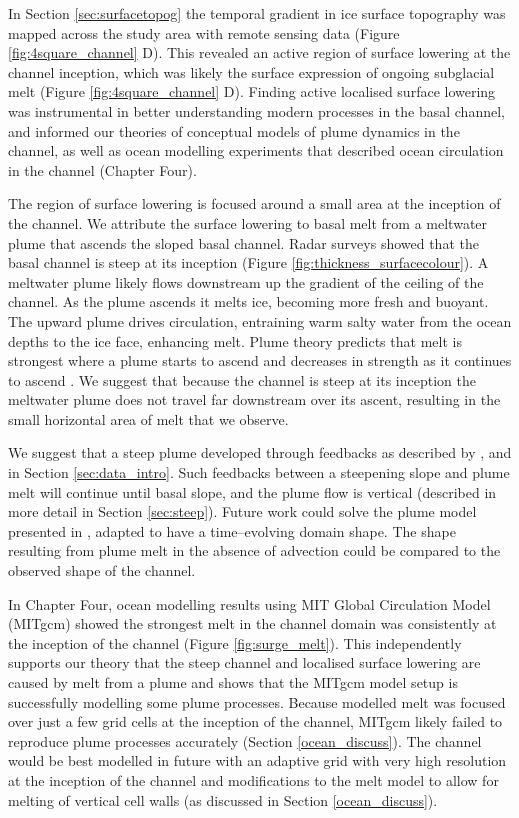 In Section \ref{sec:surfacetopog} the temporal gradient in ice surface topography was mapped across the study area with remote sensing data (Figure \ref{fig:4square_channel} D). This revealed an active region of surface lowering at the channel inception, which was likely the surface expression of ongoing subglacial melt (Figure \ref{fig:4square_channel} D).  
Finding active localised surface lowering was instrumental in better understanding modern processes in the basal channel, and informed our theories of conceptual models of plume dynamics in the channel, as well as ocean modelling experiments that described ocean circulation in the channel (Chapter Four). 

The region of surface lowering is focused around a small area at the inception of the channel. We attribute the surface lowering to basal melt from a meltwater plume that ascends the sloped basal channel. Radar surveys showed that the basal channel is steep at its inception (Figure \ref{fig:thickness_surfacecolour}). A meltwater plume likely flows downstream up the gradient of the ceiling of the channel. As the plume ascends it melts ice, becoming more fresh and buoyant. The upward plume drives circulation, entraining warm salty water from the ocean depths to the ice face, enhancing melt.  Plume theory predicts that melt is strongest where a plume starts to ascend and decreases in strength as it continues to ascend \citep{jenkins1991one}. We suggest that because the channel is steep at its inception the meltwater plume does not travel far downstream over its ascent, resulting in the small horizontal area of melt that we observe. 

We suggest that a steep plume developed through feedbacks as described by \cite{sergienko2013basal}, and in Section \ref{sec:data_intro}. Such feedbacks between a steepening slope and plume melt will continue until basal slope, and the plume flow is vertical (described in more detail in Section \ref{sec:steep}).    
Future work could solve the plume model presented in \cite{jenkins2011convection}, adapted to have a time--evolving domain shape. The shape resulting from plume melt in the absence of advection could be compared to the observed shape of the channel. 

In Chapter Four, ocean modelling results using MIT Global Circulation Model (MITgcm) showed the strongest melt in the channel domain was consistently at the inception of the channel (Figure \ref{fig:surge_melt}). This independently supports our theory that the steep channel and localised surface lowering are caused by melt from a plume and shows that the MITgcm model setup is successfully modelling some plume processes.
Because modelled melt was focused over just a few grid cells at the inception of the channel,  MITgcm likely failed to reproduce plume processes accurately (Section \ref{ocean_discuss}). The channel would be best modelled in future with an adaptive grid with very high resolution at the inception of the channel and modifications to the melt model to allow for melting of vertical cell walls (as discussed in Section \ref{ocean_discuss}).

